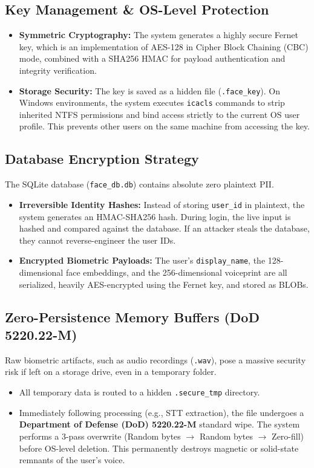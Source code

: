 \documentclass[12pt,a4paper]{article}
\begin{document}
\subsection{Key Management \& OS-Level Protection}
\begin{itemize}
    \item \textbf{Symmetric Cryptography:} The system generates a highly secure Fernet key, which is an implementation of AES-128 in Cipher Block Chaining (CBC) mode, combined with a SHA256 HMAC for payload authentication and integrity verification.
    \item \textbf{Storage Security:} The key is saved as a hidden file (\texttt{.face\_key}). On Windows environments, the system executes \texttt{icacls} commands to strip inherited NTFS permissions and bind access strictly to the current OS user profile. This prevents other users on the same machine from accessing the key.
\end{itemize}

\subsection{Database Encryption Strategy}
The SQLite database (\texttt{face\_db.db}) contains absolute zero plaintext PII.
\begin{itemize}
    \item \textbf{Irreversible Identity Hashes:} Instead of storing \texttt{user\_id} in plaintext, the system generates an HMAC-SHA256 hash. During login, the live input is hashed and compared against the database. If an attacker steals the database, they cannot reverse-engineer the user IDs.
    \item \textbf{Encrypted Biometric Payloads:} The user's \texttt{display\_name}, the 128-dimensional face embeddings, and the 256-dimensional voiceprint are all serialized, heavily AES-encrypted using the Fernet key, and stored as BLOBs. 
\end{itemize}

\subsection{Zero-Persistence Memory Buffers (DoD 5220.22-M)}
Raw biometric artifacts, such as audio recordings (\texttt{.wav}), pose a massive security risk if left on a storage drive, even in a temporary folder.
\begin{itemize}
    \item All temporary data is routed to a hidden \texttt{.secure\_tmp} directory.
    \item Immediately following processing (e.g., STT extraction), the file undergoes a \textbf{Department of Defense (DoD) 5220.22-M} standard wipe. The system performs a 3-pass overwrite (Random bytes $\rightarrow$ Random bytes $\rightarrow$ Zero-fill) before OS-level deletion. This permanently destroys magnetic or solid-state remnants of the user's voice.
\end{itemize}
\end{document}
